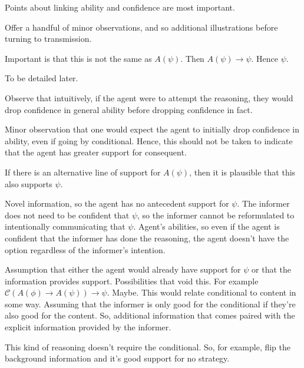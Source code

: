 \documentclass[10pt]{article}
\begin{document}
\begin{note}
  Points about linking ability and confidence are most important.

  Offer a handful of minor observations, and so additional illustrations before turning to transmission.
\end{note}

\begin{note}
  Important is that this is not the same as \(A(\psi)\).
  Then \(A(\psi) \rightarrow \psi\).
  Hence \(\psi\).

  To be detailed later.
\end{note}

\begin{note}
  Observe that intuitively, if the agent were to attempt the reasoning, they would drop confidence in general ability before dropping confidence in fact.

  Minor observation that one would expect the agent to initially drop confidence in ability, even if going by conditional.
  Hence, this should not be taken to indicate that the agent has greater support for consequent.
\end{note}

\begin{note}
  If there is an alternative line of support for \(A(\psi)\), then it is plausible that this also supports \(\psi\).
\end{note}

\begin{note}
  Novel information, so the agent has no antecedent support for \(\psi\).
  The informer does not need to be confident that \(\psi\), so the informer cannot be reformulated to intentionally communicating that \(\psi\).
  Agent's abilities, so even if the agent is confident that the informer has done the reasoning, the agent doesn't have the option regardless of the informer's intention.
\end{note}

\begin{note}
  Assumption that either the agent would already have support for \(\psi\) or that the information provides support.
  Possibilities that void this.
  For example \(\mathcal{C}(A(\phi) \rightarrow A(\psi)) \rightarrow \psi\).
  Maybe.
  This would relate conditional to content in some way.
  Assuming that the informer is only good for the conditional if they're also good for the content.
  So, additional information that comes paired with the explicit information provided by the informer.

  This kind of reasoning doesn't require the conditional.
  So, for example, flip the background information and it's good support for no strategy.
\end{note}
\end{document}
